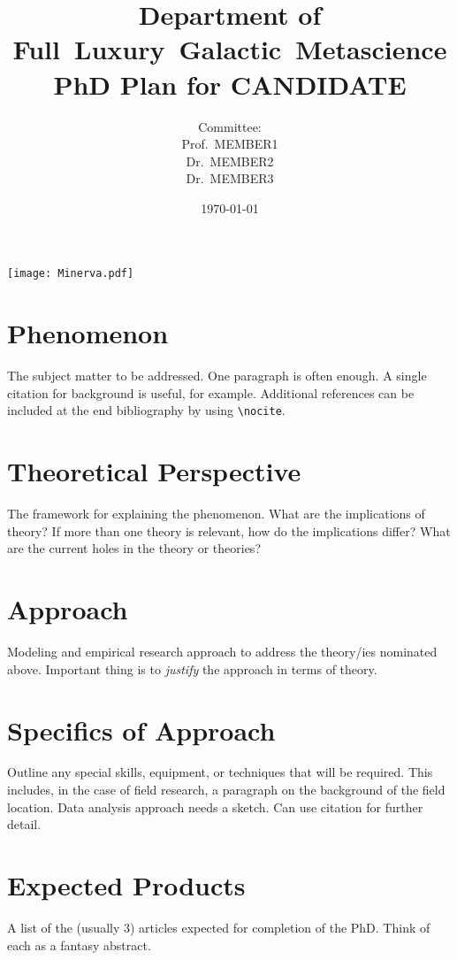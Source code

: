 \documentclass{tufte-handout}
\title[PhD Plan for CANDIDATE]{Department of \mbox{Full Luxury Galactic Metascience}\\PhD Plan for CANDIDATE}
\author[]{Committee:\\
Prof.~MEMBER1\\
Dr.~MEMBER2\\
Dr.~MEMBER3}
\date{\today}
\begin{document}
\maketitle%

\begin{marginfigure}[-5.2cm]
\texttt{[image: Minerva.pdf]}
\end{marginfigure}

\section{Phenomenon}
The subject matter to be addressed. One paragraph is often enough. A single citation for background is useful, for example.\cite{HenrichMcElreath:2003} Additional references can be included at the end bibliography by using \verb|\nocite|. \nocite{NBGA2005}

\section{Theoretical Perspective}
The framework for explaining the phenomenon. What are the implications of theory? If more than one theory is relevant, how do the implications differ? What are the current holes in the theory or theories?

\section{Approach}
Modeling and empirical research approach to address the theory/ies nominated above. Important thing is to \emph{justify} the approach in terms of theory. 

\section{Specifics of Approach}
Outline any special skills, equipment, or techniques that will be required. This includes, in the case of field research, a paragraph on the background of the field location. Data analysis approach needs a sketch. Can use citation\cite{Merowetal2014} for further detail.

\section{Expected Products}
A list of the (usually 3) articles expected for completion of the PhD. Think of each as a fantasy abstract.
\end{document}
